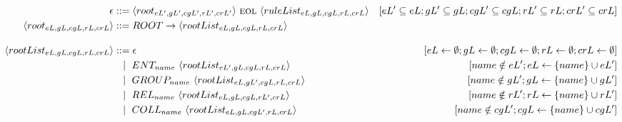 \begin{landscape}
    \centering
    \begin{adjustbox}{max width=\linewidth,max height=.95\textheight,valign=c}
        \parbox{\linewidth}{\begin{align}
                \epsilon                                    & ::= \langle root_{eL',gL',cgL',rL',crL'} \rangle ~\textsc{eol}~ \langle ruleList_{eL,gL,cgL,rL,crL} \rangle  & [eL' \subseteq eL; gL' \subseteq gL; cgL' \subseteq cgL; rL' \subseteq rL; crL' \subseteq crL]       \label{meta:start} \\
                \langle root_{eL,gL,cgL,rL,crL} \rangle     & ::= ROOT \to \langle rootList_{eL,gL,cgL,rL,crL} \rangle                                                                                                                                                                               \\[1em]
                \langle rootList_{eL,gL,cgL,rL,crL} \rangle & ::= \epsilon                                                                                                 & [eL \gets \emptyset; gL \gets \emptyset; cgL \gets \emptyset; rL \gets \emptyset; crL \gets \emptyset]                  \\
                                                            & ~~ \mid ~ ENT_{name}  ~ \langle rootList_{eL',gL,cgL,rL,crL} \rangle                                         & [name \notin eL'; eL \gets \{name\} \cup eL']                                                                           \\
                                                            & ~~ \mid ~ GROUP_{name} ~ \langle rootList_{eL,gL',cgL,rL,crL} \rangle                                        & [name \notin gL'; gL \gets \{name\} \cup gL']                                                                           \\
                                                            & ~~ \mid ~ REL_{name}  ~ \langle rootList_{eL,gL,cgL,rL',crL} \rangle                                         & [name \notin rL'; rL \gets \{name\} \cup rL']                                                                           \\
                                                            & ~~ \mid ~ COLL_{name} ~ \langle rootList_{eL,gL,cgL',rL,crL} \rangle                                         & [name \notin cgL'; cgL \gets \{name\} \cup cgL']                                                                        \\

\end{align}}
\end{adjustbox}
\end{landscape}
